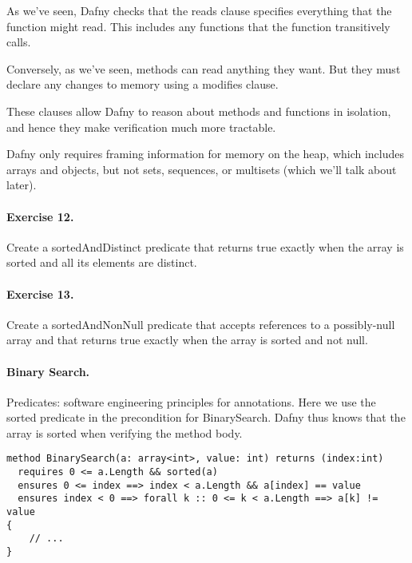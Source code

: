 \documentclass[11pt]{article}
\begin{document}
As we've seen, Dafny checks that the \textsf{reads} clause
specifies everything that the function might read. This includes
any functions that the function transitively calls.

Conversely, as we've seen, methods can read anything they want.
But they must declare any changes to memory using a \textsf{modifies}
clause.

These clauses allow Dafny to reason about methods and functions
in isolation, and hence they make verification much more tractable.

Dafny only requires framing information for memory on the heap,
which includes arrays and objects, but not sets, sequences, or multisets
(which we'll talk about later).

\paragraph{Exercise 12.} Create a \textsf{sortedAndDistinct}
predicate that returns true exactly when the array is sorted and all its
elements are distinct.

\paragraph{Exercise 13.} Create a \textsf{sortedAndNonNull}
predicate that accepts references to a possibly-null array and that
returns true exactly when the array is sorted and not null.

\paragraph{Binary Search.} Predicates: software engineering principles for
annotations. Here we use the \textsf{sorted} predicate in the precondition
for \textsf{BinarySearch}. Dafny thus knows that the array is sorted
when verifying the method body.

\begin{lstlisting}[language=dafny]
method BinarySearch(a: array<int>, value: int) returns (index:int)
  requires 0 <= a.Length && sorted(a)
  ensures 0 <= index ==> index < a.Length && a[index] == value
  ensures index < 0 ==> forall k :: 0 <= k < a.Length ==> a[k] != value
{
    // ...
}
\end{lstlisting}
\end{document}
